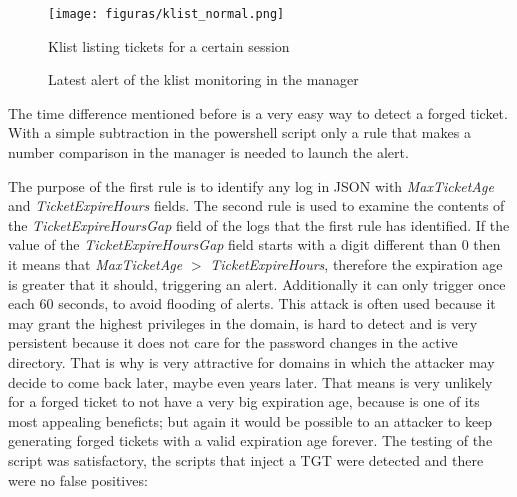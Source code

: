 \begin{figure}[H]
	\centering
	\texttt{[image: figuras/klist\_normal.png]}
	\caption{Klist listing tickets for a certain session}
\end{figure}
\begin{figure}[H]
	\centering
	\caption{Latest alert of the klist monitoring in the manager}
\end{figure}
\linej
The time difference mentioned before is a very easy way to detect a forged ticket. With a simple subtraction in the powershell script only a rule that makes a number comparison in the manager is needed to launch the alert.
\linej

\linej
The purpose of the first rule is to identify any log in JSON with \textit{MaxTicketAge} and \textit{TicketExpireHours} fields. The second rule is used to examine the contents of the \textit{TicketExpireHoursGap} field of the logs that the first rule has identified. If the value of the \textit{TicketExpireHoursGap} field starts with a digit different than 0 then it means that \textit{MaxTicketAge} $>$ \textit{TicketExpireHours}, therefore the expiration age is greater that it should, triggering an alert.
Additionally it can only trigger once each 60 seconds, to avoid flooding of alerts.
\linej
\linej
This attack is often used because it may grant the highest privileges in the domain, is hard to detect and is very persistent because it does not care for the password changes in the active directory. That is why is very attractive for domains in which the attacker may decide to come back later, maybe even years later. That means is very unlikely for a forged ticket to not have a very big expiration age, because is one of its most appealing beneficts; but again it would be possible to an attacker to keep generating forged tickets with a valid expiration age forever.
\linej
\linej
The testing of the script was satisfactory, the scripts that inject a TGT were detected and there were no false positives:
